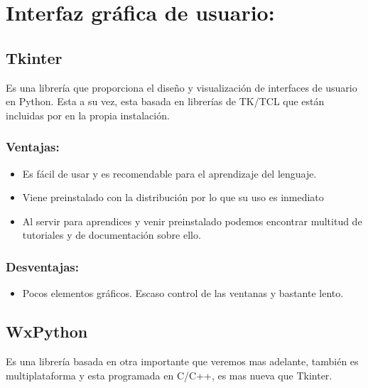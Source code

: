 
\section{Interfaz gráfica de usuario:}
\subsection{Tkinter}
Es una librería que proporciona el diseño y visualización de interfaces de usuario en Python. Esta a su vez, esta basada en librerías de TK/TCL que están incluidas por en la propia instalación.

\subsubsection{Ventajas:}
\begin{itemize}
\item Es fácil de usar y es recomendable para el aprendizaje del lenguaje.

\item Viene preinstalado con la distribución por lo que su uso es inmediato

\item Al servir para aprendices y venir preinstalado podemos encontrar multitud de tutoriales y de documentación sobre ello.
\end{itemize}

\subsubsection{Desventajas:}
\begin{itemize}
\item Pocos elementos gráficos. Escaso control de las ventanas y bastante lento.
\end{itemize}

\subsection{WxPython}
Es una librería basada en otra importante que veremos mas adelante, también es multiplataforma y esta programada en C/C++, es mas nueva que Tkinter.
